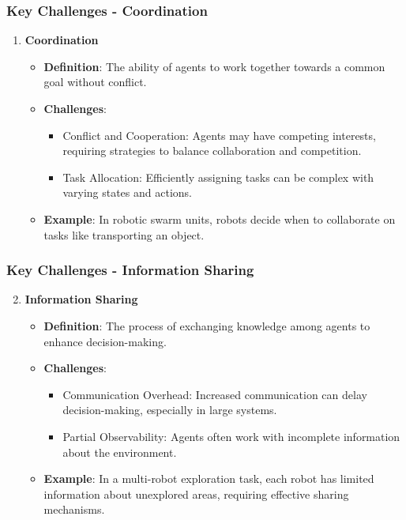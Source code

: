 \documentclass[aspectratio=169]{beamer}
\begin{document}
\begin{frame}[fragile]
    \frametitle{Key Challenges - Coordination}
    \begin{enumerate}
        \item \textbf{Coordination}
        \begin{itemize}
            \item \textbf{Definition}: The ability of agents to work together towards a common goal without conflict.
            \item \textbf{Challenges}:
            \begin{itemize}
                \item Conflict and Cooperation: Agents may have competing interests, requiring strategies to balance collaboration and competition.
                \item Task Allocation: Efficiently assigning tasks can be complex with varying states and actions.
            \end{itemize}
            \item \textbf{Example}: In robotic swarm units, robots decide when to collaborate on tasks like transporting an object.
        \end{itemize}
    \end{enumerate}
\end{frame}

\begin{frame}[fragile]
    \frametitle{Key Challenges - Information Sharing}
    \begin{enumerate}
        \setcounter{enumi}{1}
        \item \textbf{Information Sharing}
        \begin{itemize}
            \item \textbf{Definition}: The process of exchanging knowledge among agents to enhance decision-making.
            \item \textbf{Challenges}:
            \begin{itemize}
                \item Communication Overhead: Increased communication can delay decision-making, especially in large systems.
                \item Partial Observability: Agents often work with incomplete information about the environment.
            \end{itemize}
            \item \textbf{Example}: In a multi-robot exploration task, each robot has limited information about unexplored areas, requiring effective sharing mechanisms.
        \end{itemize}
    \end{enumerate}
\end{frame}
\end{document}
